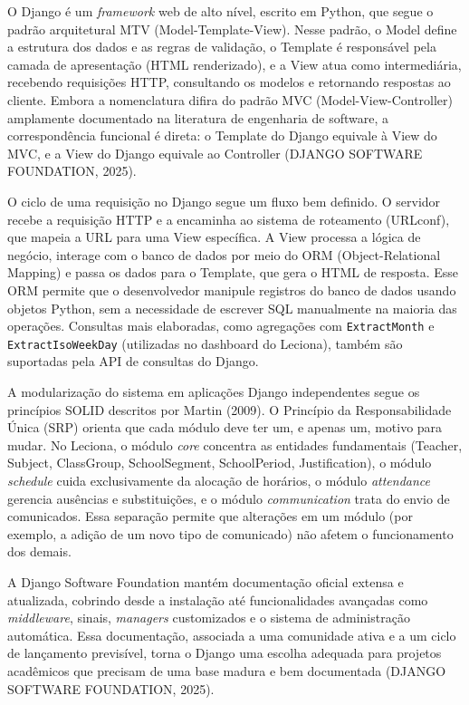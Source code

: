 O Django é um \textit{framework} web de alto nível, escrito em Python, que segue o padrão arquitetural MTV (Model-Template-View). Nesse padrão, o Model define a estrutura dos dados e as regras de validação, o Template é responsável pela camada de apresentação (HTML renderizado), e a View atua como intermediária, recebendo requisições HTTP, consultando os modelos e retornando respostas ao cliente. Embora a nomenclatura difira do padrão MVC (Model-View-Controller) amplamente documentado na literatura de engenharia de software, a correspondência funcional é direta: o Template do Django equivale à View do MVC, e a View do Django equivale ao Controller (DJANGO SOFTWARE FOUNDATION, 2025).

O ciclo de uma requisição no Django segue um fluxo bem definido. O servidor recebe a requisição HTTP e a encaminha ao sistema de roteamento (URLconf), que mapeia a URL para uma View específica. A View processa a lógica de negócio, interage com o banco de dados por meio do ORM (Object-Relational Mapping) e passa os dados para o Template, que gera o HTML de resposta. Esse ORM permite que o desenvolvedor manipule registros do banco de dados usando objetos Python, sem a necessidade de escrever SQL manualmente na maioria das operações. Consultas mais elaboradas, como agregações com \texttt{ExtractMonth} e \texttt{ExtractIsoWeekDay} (utilizadas no dashboard do Leciona), também são suportadas pela API de consultas do Django.

A modularização do sistema em aplicações Django independentes segue os princípios SOLID descritos por Martin (2009). O Princípio da Responsabilidade Única (SRP) orienta que cada módulo deve ter um, e apenas um, motivo para mudar. No Leciona, o módulo \textit{core} concentra as entidades fundamentais (Teacher, Subject, ClassGroup, SchoolSegment, SchoolPeriod, Justification), o módulo \textit{schedule} cuida exclusivamente da alocação de horários, o módulo \textit{attendance} gerencia ausências e substituições, e o módulo \textit{communication} trata do envio de comunicados. Essa separação permite que alterações em um módulo (por exemplo, a adição de um novo tipo de comunicado) não afetem o funcionamento dos demais.

A Django Software Foundation mantém documentação oficial extensa e atualizada, cobrindo desde a instalação até funcionalidades avançadas como \textit{middleware}, sinais, \textit{managers} customizados e o sistema de administração automática. Essa documentação, associada a uma comunidade ativa e a um ciclo de lançamento previsível, torna o Django uma escolha adequada para projetos acadêmicos que precisam de uma base madura e bem documentada (DJANGO SOFTWARE FOUNDATION, 2025).


